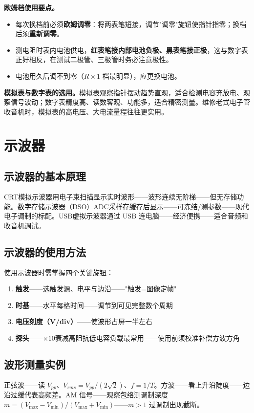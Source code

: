 \documentclass[12pt,UTF8]{ctexbook}
\begin{document}
\textbf{欧姆档使用要点。}
\begin{itemize}
  \item 每次换档前必须\textbf{欧姆调零}：将两表笔短接，调节"调零"旋钮使指针指零；换档后须\textbf{重新调零}。
  \item 测电阻时表内电池供电，\textbf{红表笔接内部电池负极、黑表笔接正极}，这与数字表正好相反，在测试二极管、三极管时务必注意极性。
  \item 电池用久后调不到零（$R\times1$ 档最明显），应更换电池。
\end{itemize}

\textbf{模拟表与数字表的选用。}模拟表观察指针摆动趋势直观，适合检测电容充放电、观察信号波动；数字表精度高、读数客观、功能多，适合精密测量。维修老式电子管收音机时，模拟表的高电压、大电流量程往往更实用。

\section{示波器}
\label{sec:oscilloscope}

\subsection{示波器的基本原理}
CRT模拟示波器用电子束扫描显示实时波形——波形连续无阶梯——但无存储功能。数字存储示波器（DSO）ADC采样存缓存后显示——可冻结/测参数——现代电子调制的标配。USB虚拟示波器通过 USB 连电脑——经济便携——适合音频和收音机调试。

\subsection{示波器的使用方法}

使用示波器时需掌握四个关键旋钮：

\begin{enumerate}
\item \textbf{触发}——选触发源、电平与边沿——"触发=图像定帧"
\item \textbf{时基}——水平每格时间——调节到可见完整数个周期
\item \textbf{电压刻度（V/div）}——使波形占屏一半左右
\item \textbf{探头}——$\times10$衰减高阻抗低电容负载最常用——使用前须校准补偿方波方角
\end{enumerate}

\subsection{波形测量实例}
正弦波——读 $V_{pp}$、$V_{rms}=V_{pp}/(2\sqrt{2})$、$f=1/T$。方波——看上升沿陡度——边沿过缓代表高频差。AM 信号——观察包络测调制深度 $m=(V_{\max}-V_{\min})/(V_{\max}+V_{\min})$——$m>1$ 过调制出现截断。
\end{document}
